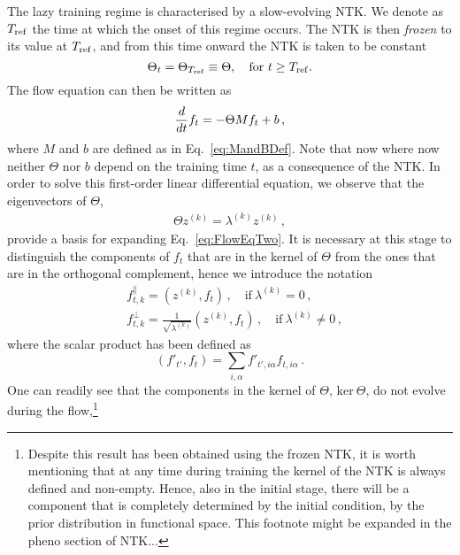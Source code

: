 The lazy training regime is characterised by a slow-evolving NTK. We denote as
$T_{\rm ref}$ the time at which the onset of this regime occurs. The NTK is then
\textit{frozen} to its value at $T_{\rm ref}$, and from this time onward the NTK
is taken to be constant
\begin{equation}
  \Theta_t = \Theta_{T_{\rm ref}} \equiv \Theta, \quad \textrm{for } t \geq T_{\rm ref}.
\end{equation} 
The flow equation can then be written as
\begin{align}
  \frac{d}{dt} f_t = -\Theta M f_t + b\, ,
  \label{eq:FlowEqTwo}
\end{align}
where $M$ and $b$ are defined as in Eq.~\eqref{eq:MandBDef}. Note that now where
now neither $\Theta$ nor $b$ depend on the training time $t$, as a consequence
of the NTK. In order to solve this first-order linear differential equation, we
observe that the eigenvectors of $\Theta$,
\begin{align}
    \label{eq:ThetaEigensystem}
    \Theta z^{(k)} = \lambda^{(k)} z^{(k)}\, ,
\end{align}
provide a basis for expanding Eq.~\eqref{eq:FlowEqTwo}. It is necessary at this
stage to distinguish the components of $f_t$ that are in the kernel of $\Theta$
from the ones that are in the orthogonal complement, hence we introduce the
notation
\begin{align}
    \label{eq:ParallelCompnents}
    &f^\parallel_{t,k} = \left(z^{(k)}, f_t\right)\, , \quad \text{if}\ \lambda^{(k)} = 0\, , \\
    \label{eq:OrthogonalComponents}
    &f^\perp_{t,k} = \frac{1}{\sqrt{\lambda^{(k)}}} \left(z^{(k)}, f_t\right)\, , \quad
        \text{if}\ \lambda^{(k)} \neq 0\, ,
\end{align}
where the scalar product has been defined as
\begin{equation}
  \left(f'_{t'}, f_t\right) = \sum_{i,\alpha} f'_{t',i\alpha} f_{t,i\alpha}\,.
\end{equation}
One can readily see that the components in the kernel of $\Theta$, $\text{ker}\
\Theta$, do not evolve during the flow,\footnote{ Despite this result has been
obtained using the frozen NTK, it is worth mentioning that at any time during
training the kernel of the NTK is always defined and non-empty. Hence, also in
the initial stage, there will be a component that is completely determined by
the initial condition, \ie by the prior distribution in functional space.
\ac{This footnote might be expanded in the pheno section of NTK...}}
